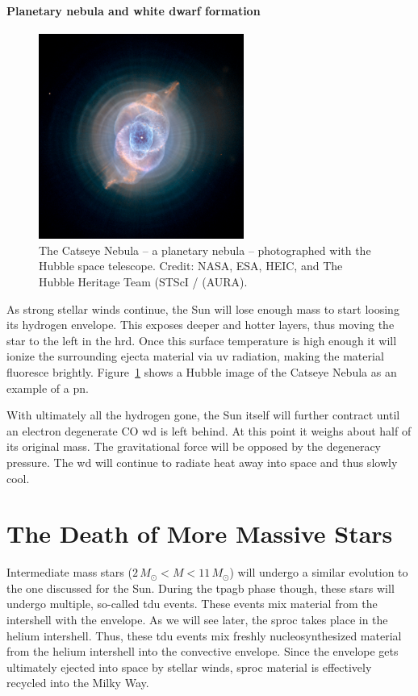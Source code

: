 \paragraph{Planetary nebula and white dwarf formation}
\begin{figure}[tb]
    \centering
    \includegraphics[width=0.6\textwidth]{graphics/sun/catseye_nebula}
    \caption{The Catseye Nebula -- a planetary nebula -- photographed with the Hubble space telescope. Credit: NASA, ESA, HEIC, and The Hubble Heritage Team (STScI / (AURA).}
    \label{fig:sun:catseye_nebula}
\end{figure}
As strong stellar winds continue, the Sun will lose enough mass to start loosing its hydrogen envelope. This exposes deeper and hotter layers, thus moving the star to the left in the \ac{hrd}. Once this surface temperature is high enough it will ionize the surrounding ejecta material via \ac{uv} radiation, making the material fluoresce brightly.
Figure~\ref{fig:sun:catseye_nebula} shows a Hubble image of the Catseye Nebula as an example of a \ac{pn}.

With ultimately all the hydrogen gone, the Sun itself will further contract until an electron degenerate CO \ac{wd} is left behind. At this point it weighs about half of its original mass. The gravitational force will be opposed by the degeneracy pressure. The \ac{wd} will continue to radiate heat away into space and thus slowly cool.


\section{The Death of More Massive Stars}

Intermediate mass stars ($2\,M_\odot < M < 11\,M_\odot$) will undergo a similar evolution to the one discussed for the Sun. During the \ac{tpagb} phase though, these stars will undergo multiple, so-called \ac{tdu} events. These events mix material from the intershell with the envelope. As we will see later, the \ac{sproc} takes place in the helium intershell. Thus, these \ac{tdu} events mix freshly nucleosynthesized material from the helium intershell into the convective envelope. Since the envelope gets ultimately ejected into space by stellar winds, \ac{sproc} material is effectively recycled into the Milky Way.

